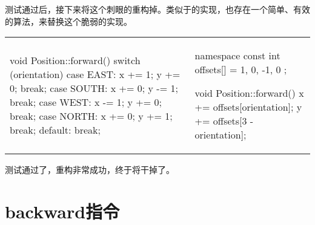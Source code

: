 \begin{content}
测试通过后，接下来将这个刺眼的重构掉。类似于的实现，也存在一个简单、有效的算法，来替换这个脆弱的实现。

\begin{tabular}{@{}p{} 
                 | p{}@{}}
\begin{c++}[caption={src/robot-cleaner/Position.cpp}]
void Position::forward()
{
    switch (orientation)
    {
    case EAST:
        x += 1; y += 0;
        break;
    case SOUTH:
        x += 0; y -= 1;
        break;
    case WEST:
        x -= 1; y += 0;
        break;
    case NORTH:
        x += 0; y += 1;
        break;
    default: break;
    }
}
\end{c++}
&
\begin{c++}[caption={src/robot-cleaner/Position.cpp}]
namespace
{
    const int offsets[] = { 1, 0, -1, 0 };
}

void Position::forward()
{
    x += offsets[orientation];
    y += offsets[3 - orientation];
}
\end{c++}
\end{tabular}

测试通过了，重构非常成功，终于将干掉了。

\end{content}

\section{backward指令}


